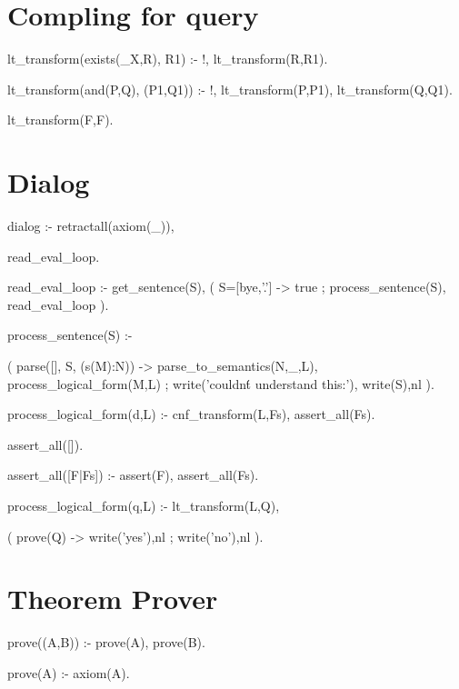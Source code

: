 \documentclass{book}[9pt]
\newenvironment{code}%
{\small \verbatim}%
{\endverbatim \large}
\begin{document}
\section{Compling for query}

\begin{code}
lt_transform(exists(_X,R), R1) :- !,
        lt_transform(R,R1).

lt_transform(and(P,Q), (P1,Q1)) :- !,
        lt_transform(P,P1),
        lt_transform(Q,Q1).

lt_transform(F,F).
\end{code}

\section{Dialog}

\begin{code}
dialog :-
        retractall(axiom(_)),
        
        read_eval_loop.

read_eval_loop :-
        get_sentence(S),
        ( S=[bye,'.'] ->
            true
        ;
            process_sentence(S),
            read_eval_loop
        ).

process_sentence(S) :-
            
        (  parse([], S, (s(M):N)) ->
            parse_to_semantics(N,_,L),
            process_logical_form(M,L)
        ;
             write('couldn\'t understand this:'),
             write(S),nl
        ).


process_logical_form(d,L) :-
    cnf_transform(L,Fs),
    assert_all(Fs).

assert_all([]).
    
assert_all([F|Fs]) :-
    assert(F),
    assert_all(Fs).

process_logical_form(q,L) :-
    lt_transform(L,Q),
    
    (  prove(Q) ->
        write('yes'),nl
     ; 
        write('no'),nl
    ).
\end{code}

\section{Theorem Prover}

\begin{code}
prove((A,B)) :-
    prove(A),
    prove(B).

prove(A) :- axiom(A).
\end{code}
\end{document}

